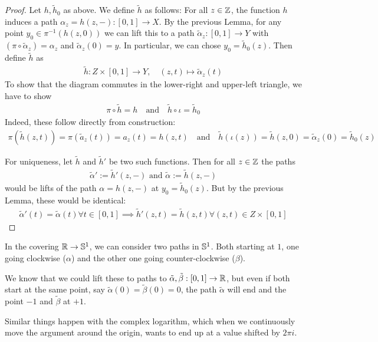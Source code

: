 \begin{proof}
  Let $h,\tilde{h}_0$ as above.
  We define $\tilde{h}$ as follows:
  For all $z \in \mathbb{Z}$, the function $h$ induces a path $\alpha_z = h(z,-): [0,1] \to X$.
  By the previous Lemma, for any point $y_0 \in \pi^{-1}(h(z,0))$ we can lift this to a path $\tilde{\alpha}_z: [0,1] \to Y$ 
  with
  $(\pi \circ \tilde{\alpha}_z) = \alpha_z$ and $\tilde{\alpha}_z(0) = y$.
  In particular, we can chose $y_0 = \tilde{h}_0(z)$.
  Then define $\tilde{h}$ as
  \begin{align*}
    \tilde{h}: Z \times [0,1] \to Y, \quad (z,t) \mapsto
    \tilde{\alpha}_z(t)
  \end{align*}
  To show that the diagram commutes in the lower-right and upper-left triangle, we have to show
  \begin{align*}
    \pi \circ \tilde{h} = h \quad \text{and} \quad \tilde{h} \circ \iota = \tilde{h}_0
  \end{align*}
  Indeed, these follow directly from construction:
  \begin{align*}
    \pi(\tilde{h}(z,t))
    =
    \pi(\tilde{a}_z(t)) 
    = 
    a_z(t) 
    = 
    h(z,t) 
    \quad \text{and} \quad 
    \tilde{h}(\iota(z))
    =
    \tilde{h}(z,0)
    =
    \tilde{\alpha}_z(0)
    = 
    \tilde{h}_0(z)
  \end{align*}
  
  For uniqueness, let $\tilde{h}$ and $\tilde{h}'$ be two such functions. Then for all $z \in \mathbb{Z}$ the paths
  \begin{align*}
    \tilde{\alpha}' := \tilde{h}'(z,-) \text{ and } \tilde{\alpha} := \tilde{h}(z,-)
  \end{align*}
  would be lifts of the path $\alpha = h(z,-)$ at $y_0 = \tilde{h}_0(z)$.
  But by the previous Lemma, these would be identical:
  \begin{align*}
    \tilde{\alpha}'(t) = \tilde{\alpha}(t) \forall t \in [0,1] \implies \tilde{h}'(z,t) = \tilde{h}(z,t) \forall (z,t) \in Z \times [0,1]
  \end{align*}
\end{proof}



\begin{ex}[Monodromy]
  In the covering $\mathbb{R} \to \mathbb{S}^{1}$, we can consider two paths in $\mathbb{S}^{1}$. Both starting at $1$, one going clockwise ($\alpha$) and the other one going counter-clockwise ($\beta$).

  We know that we could lift these to paths to $\tilde{\alpha},\tilde{\beta}:[0,1] \to \mathbb{R}$, but even if both start at the same point, say $\tilde{\alpha}(0) = \tilde{\beta}(0) = 0$,
  the path $\tilde{\alpha}$ will end and the point $-1$ and $\tilde{\beta}$ at $+1$.

  Similar things happen with the complex logarithm, which when we continuously move the argument around the origin, wants to end up at a value shifted by $2 \pi i$.
\end{ex}



